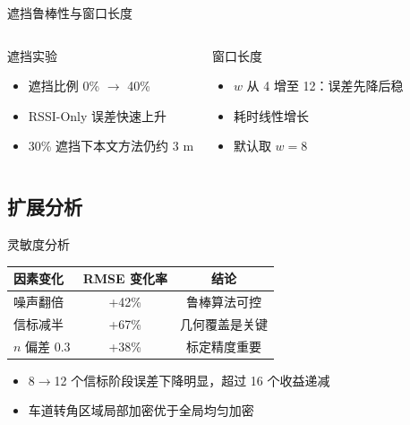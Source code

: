 \documentclass[aspectratio=169]{beamer}
\begin{document}
\begin{frame}{遮挡鲁棒性与窗口长度}
  \begin{columns}[T]
    \begin{block}{遮挡实验}
      \begin{itemize}
        \item 遮挡比例 0\% $\rightarrow$ 40\%
        \item RSSI-Only 误差快速上升
        \item 30\% 遮挡下本文方法仍约 3 m
      \end{itemize}
    \end{block}
    \begin{block}{窗口长度}
      \begin{itemize}
        \item $w$ 从 4 增至 12：误差先降后稳
        \item 耗时线性增长
        \item 默认取 $w=8$
      \end{itemize}
    \end{block}
  \end{columns}
\end{frame}

\subsection{扩展分析}

\begin{frame}{灵敏度分析}
  \begin{table}
    \centering
    \small
    \begin{tabular}{lcc}
      \toprule
      因素变化 & RMSE 变化率 & 结论 \\
      \midrule
      噪声翻倍 & +42\% & 鲁棒算法可控 \\
      信标减半 & +67\% & 几何覆盖是关键 \\
      $n$ 偏差 0.3 & +38\% & 标定精度重要 \\
      \bottomrule
    \end{tabular}
  \end{table}
  \begin{itemize}
    \item 8$\rightarrow$12 个信标阶段误差下降明显，超过 16 个收益递减
    \item 车道转角区域局部加密优于全局均匀加密
  \end{itemize}
\end{frame}
\end{document}
